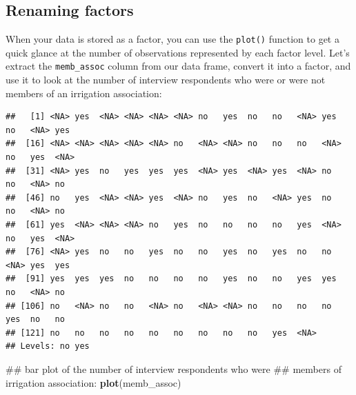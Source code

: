 \documentclass[]{book}
\newenvironment{Shaded}{\begin{snugshade}}{\end{snugshade}}
\newcommand{\KeywordTok}[1]{\textcolor[rgb]{0.13,0.29,0.53}{\textbf{#1}}}
\newcommand{\StringTok}[1]{\textcolor[rgb]{0.31,0.60,0.02}{#1}}
\newcommand{\OperatorTok}[1]{\textcolor[rgb]{0.81,0.36,0.00}{\textbf{#1}}}
\newcommand{\NormalTok}[1]{#1}
\begin{document}
\subsection{Renaming factors}\label{renaming-factors}

When your data is stored as a factor, you can use the \texttt{plot()}
function to get a quick glance at the number of observations represented
by each factor level. Let's extract the \texttt{memb\_assoc} column from
our data frame, convert it into a factor, and use it to look at the
number of interview respondents who were or were not members of an
irrigation association:

\begin{Shaded}
\end{Shaded}

\begin{verbatim}
##   [1] <NA> yes  <NA> <NA> <NA> <NA> no   yes  no   no   <NA> yes  no   <NA> yes 
##  [16] <NA> <NA> <NA> <NA> <NA> no   <NA> <NA> no   no   no   <NA> no   yes  <NA>
##  [31] <NA> yes  no   yes  yes  yes  <NA> yes  <NA> yes  <NA> no   no   <NA> no  
##  [46] no   yes  <NA> <NA> yes  <NA> no   yes  no   <NA> yes  no   no   <NA> no  
##  [61] yes  <NA> <NA> <NA> no   yes  no   no   no   no   yes  <NA> no   yes  <NA>
##  [76] <NA> yes  no   no   yes  no   no   yes  no   yes  no   no   <NA> yes  yes 
##  [91] yes  yes  yes  no   no   no   no   yes  no   no   yes  yes  no   <NA> no  
## [106] no   <NA> no   no   <NA> no   <NA> <NA> no   no   no   no   yes  no   no  
## [121] no   no   no   no   no   no   no   no   no   yes  <NA>
## Levels: no yes
\end{verbatim}

\begin{Shaded}
\begin{Highlighting}[]
\NormalTok{## bar plot of the number of interview respondents who were}
\NormalTok{## members of irrigation association:}
\KeywordTok{plot}\NormalTok{(memb_assoc)}
\end{Highlighting}
\end{Shaded}
\end{document}
